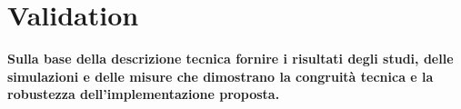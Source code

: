 \section{Validation}
\label{sec:Validation}

{\bf\color{red}
Sulla base della descrizione tecnica fornire i risultati degli studi, delle simulazioni e
delle misure che dimostrano la congruità tecnica e la robustezza
dell’implementazione proposta.
}
